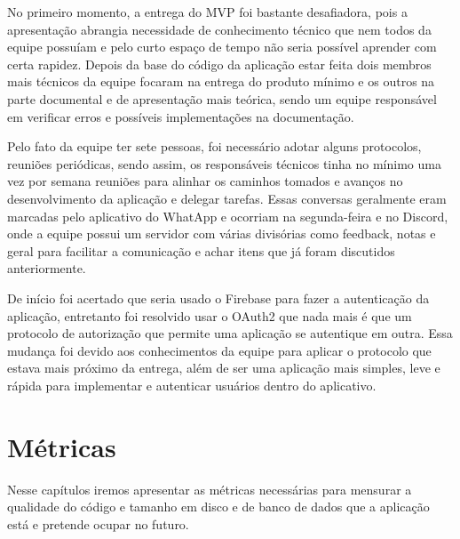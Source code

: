 No primeiro momento, a entrega do MVP foi bastante desafiadora, pois a apresentação abrangia necessidade de conhecimento técnico que nem todos da equipe possuíam e pelo curto espaço de tempo não seria possível aprender com certa rapidez. Depois da base do código da aplicação estar feita dois membros mais técnicos da equipe focaram na entrega do produto mínimo e os outros na parte documental e de apresentação mais teórica, sendo um equipe responsável em verificar erros e possíveis implementações na documentação.

Pelo fato da equipe ter sete pessoas, foi necessário adotar alguns protocolos, reuniões periódicas, sendo assim, os responsáveis técnicos tinha no mínimo uma vez por semana reuniões para alinhar os caminhos tomados e avanços no desenvolvimento da aplicação e delegar tarefas. Essas conversas geralmente eram marcadas pelo aplicativo do WhatApp e ocorriam na segunda-feira e no Discord, onde a equipe possui um servidor com várias divisórias como feedback, notas e geral para facilitar a comunicação e achar itens que já foram discutidos anteriormente.  

De início foi acertado que seria usado o Firebase para fazer a autenticação da aplicação, entretanto foi resolvido usar o OAuth2 que nada mais é que um protocolo de autorização que permite uma aplicação se autentique em outra. Essa mudança foi devido aos conhecimentos da equipe para aplicar o protocolo que estava mais próximo da entrega, além de ser uma aplicação mais simples, leve e rápida para implementar e autenticar usuários dentro do aplicativo. 
 
\section{Métricas}
Nesse capítulos iremos apresentar as métricas necessárias para mensurar a qualidade do código e tamanho em disco e de banco de dados que a aplicação está e pretende ocupar no futuro. 


